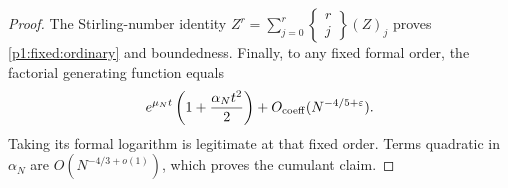 \begin{proof}
The Stirling-number identity
\(Z^r=\sum_{j=0}^r\left\{\begin{smallmatrix}r\\j\end{smallmatrix}\right\}(Z)_j\)
proves \eqref{p1:fixed:ordinary} and boundedness.
Finally, to any fixed formal order, the factorial
generating function equals
\[
 e^{\mu_N t}\left(1+\frac{\alpha_Nt^2}{2}\right)
       +O_{\rm coeff}(N^{-4/5+\varepsilon}).
\]
Taking its formal logarithm is legitimate at that
fixed order. Terms quadratic in \(\alpha_N\) are
\(O(N^{-4/3+o(1)})\), which proves the cumulant claim.
\end{proof}
